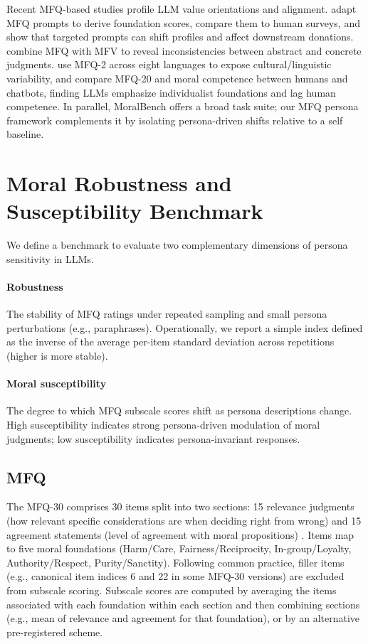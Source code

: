 \documentclass{article}
\begin{document}
Recent MFQ-based studies profile LLM value orientations and alignment. \citet{abdulhai-etal-2024-moral} adapt MFQ prompts to derive foundation scores, compare them to human surveys, and show that targeted prompts can shift profiles and affect downstream donations. \citet{nunes2024hypocrites} combine MFQ with MFV to reveal inconsistencies between abstract and concrete judgments. \citet{aksoy2024whose} use MFQ-2 across eight languages to expose cultural/linguistic variability, and \citet{bajpai2024insights} compare MFQ-20 and moral competence between humans and chatbots, finding LLMs emphasize individualist foundations and lag human competence. In parallel, MoralBench \citep{ji2025moralbenchmoralevaluationllms} offers a broad task suite; our MFQ persona framework complements it by isolating persona-driven shifts relative to a self baseline.

\section{Moral Robustness and Susceptibility Benchmark}
We define a benchmark to evaluate two complementary dimensions of persona sensitivity in LLMs.

\paragraph{Robustness} The stability of MFQ ratings under repeated sampling and small persona perturbations (e.g., paraphrases). Operationally, we report a simple index defined as the inverse of the average per-item standard deviation across repetitions (higher is more stable).

\paragraph{Moral susceptibility} The degree to which MFQ subscale scores shift as persona descriptions change. High susceptibility indicates strong persona-driven modulation of moral judgments; low susceptibility indicates persona-invariant responses.

\subsection{MFQ}
The MFQ-30 comprises 30 items split into two sections: 15 relevance judgments (how relevant specific considerations are when deciding right from wrong) and 15 agreement statements (level of agreement with moral propositions) \citep{graham2011mfq}. Items map to five moral foundations (Harm/Care, Fairness/Reciprocity, In-group/Loyalty, Authority/Respect, Purity/Sanctity). Following common practice, filler items (e.g., canonical item indices 6 and 22 in some MFQ-30 versions) are excluded from subscale scoring. Subscale scores are computed by averaging the items associated with each foundation within each section and then combining sections (e.g., mean of relevance and agreement for that foundation), or by an alternative pre-registered scheme.
\end{document}
